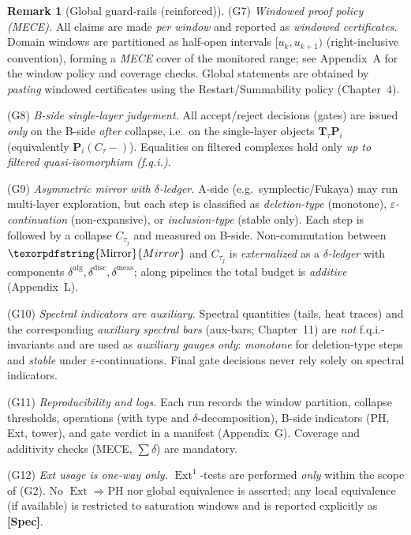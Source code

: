 \documentclass[11pt]{article}
\DeclareMathOperator{\Ext}{Ext}
\numberwithin{equation}{section}
\theoremstyle{definition}
\newtheorem{remark}[theorem]{Remark}
\DeclareRobustCommand{\Mirror}{\texorpdfstring{\ensuremath{\operatorname{Mirror}}}{Mirror}}
\begin{document}
\begin{remark}[Global guard-rails (reinforced)]
(G7) \emph{Windowed proof policy (MECE).} All claims are made \emph{per window} and reported as \emph{windowed certificates}. Domain windows are partitioned as half-open intervals $[u_k,u_{k+1})$ (right-inclusive convention), forming a \emph{MECE} cover of the monitored range; see Appendix~A for the window policy and coverage checks. Global statements are obtained by \emph{pasting} windowed certificates using the Restart/Summability policy (Chapter~4).

(G8) \emph{B-side single-layer judgement.} All accept/reject decisions (gates) are issued \emph{only} on the B-side \emph{after} collapse, i.e.\ on the single-layer objects $\mathbf{T}_\tau\mathbf{P}_i$ (equivalently $\mathbf{P}_i(C_\tau -)$). Equalities on filtered complexes hold only \emph{up to filtered quasi-isomorphism (f.q.i.)}.

(G9) \emph{Asymmetric mirror with $\delta$-ledger.} A-side (e.g.\ symplectic/Fukaya) may run multi-layer exploration, but each step is classified as \emph{deletion-type} (monotone), \emph{$\varepsilon$-continuation} (non-expansive), or \emph{inclusion-type} (stable only). Each step is followed by a collapse $C_{\tau_j}$ and measured on B-side. Non-commutation between $\Mirror$ and $C_{\tau_j}$ is \emph{externalized} as a \emph{$\delta$-ledger} with components $\delta^{\mathrm{alg}},\delta^{\mathrm{disc}},\delta^{\mathrm{meas}}$; along pipelines the total budget is \emph{additive} (Appendix~L).

(G10) \emph{Spectral indicators are auxiliary.} Spectral quantities (tails, heat traces) and the corresponding \emph{auxiliary spectral bars} (aux-bars; Chapter~11) are \emph{not} f.q.i.-invariants and are used as \emph{auxiliary gauges only}: \emph{monotone} for deletion-type steps and \emph{stable} under $\varepsilon$-continuations. Final gate decisions never rely solely on spectral indicators.

(G11) \emph{Reproducibility and logs.} Each run records the window partition, collapse thresholds, operations (with type and $\delta$-decomposition), B-side indicators (PH, Ext, tower), and gate verdict in a manifest (Appendix~G). Coverage and additivity checks (MECE, $\sum\delta$) are mandatory.

(G12) \emph{Ext usage is one-way only.} $\Ext^1$-tests are performed \emph{only} within the scope of (G2). No $\Ext\Rightarrow\mathrm{PH}$ nor global equivalence is asserted; any local equivalence (if available) is restricted to saturation windows and is reported explicitly as \textbf{[Spec]}.
\end{remark}
\end{document}
